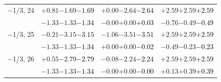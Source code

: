 \documentclass[compress]{beamer}
\begin{document}
\begin{frame}
\begin{tabular}{r | c | c | c}
$-$1/3, 24 & $+0.81$\hspace{0.1 cm}$-1.69$\hspace{0.1 cm}\textcolor{black}{$-1.69$} & $+0.00$\hspace{0.1 cm}$-2.64$\hspace{0.1 cm}\textcolor{black}{$-2.64$} & $+2.59$\hspace{0.1 cm}$+2.59$\hspace{0.1 cm}\textcolor{black}{$+2.59$} \\
           & $-1.33$\hspace{0.1 cm}$-1.33$\hspace{0.1 cm}\textcolor{black}{$-1.34$} & $-0.00$\hspace{0.1 cm}$+0.00$\hspace{0.1 cm}\textcolor{black}{$+0.03$} & $-0.76$\hspace{0.1 cm}$-0.49$\hspace{0.1 cm}\textcolor{black}{$-0.49$} \\
$-$1/3, 25 & $-0.21$\hspace{0.1 cm}$-3.15$\hspace{0.1 cm}\textcolor{black}{$-3.15$} & $-1.06$\hspace{0.1 cm}$-3.51$\hspace{0.1 cm}\textcolor{black}{$-3.51$} & $+2.59$\hspace{0.1 cm}$+2.59$\hspace{0.1 cm}\textcolor{black}{$+2.59$} \\
           & $-1.33$\hspace{0.1 cm}$-1.33$\hspace{0.1 cm}\textcolor{black}{$-1.34$} & $+0.00$\hspace{0.1 cm}$+0.00$\hspace{0.1 cm}\textcolor{black}{$-0.02$} & $-0.49$\hspace{0.1 cm}$-0.23$\hspace{0.1 cm}\textcolor{black}{$-0.23$} \\
$-$1/3, 26 & $+0.55$\hspace{0.1 cm}$-2.79$\hspace{0.1 cm}\textcolor{black}{$-2.79$} & $-0.08$\hspace{0.1 cm}$-2.24$\hspace{0.1 cm}\textcolor{black}{$-2.24$} & $+2.59$\hspace{0.1 cm}$+2.59$\hspace{0.1 cm}\textcolor{black}{$+2.59$} \\
           & $-1.33$\hspace{0.1 cm}$-1.33$\hspace{0.1 cm}\textcolor{black}{$-1.34$} & $-0.00$\hspace{0.1 cm}$+0.00$\hspace{0.1 cm}\textcolor{black}{$-0.00$} & $+0.13$\hspace{0.1 cm}$+0.39$\hspace{0.1 cm}\textcolor{black}{$+0.39$} \\

\end{tabular}
\end{frame}
\end{document}
